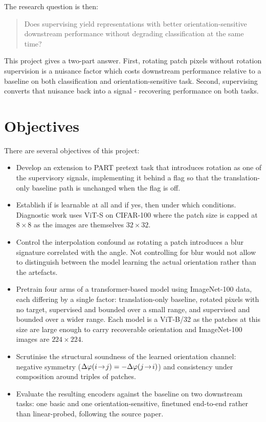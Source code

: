 \documentclass[final_report.tex]{subfiles}
\begin{document}
The research question is then: 
\begin{quote}Does supervising \dphi{} yield representations with better orientation-sensitive downstream performance without degrading classification at the same time?
\end{quote}

This project gives a two-part answer. First, rotating patch pixels without rotation supervision is a nuisance factor which costs downstream performance relative to a baseline on both classification and orientation-sensitive task. Second, supervising \dphi{} converts that nuisance back into a signal - recovering performance on both tasks.

\section{Objectives}\label{sec:objectives}
There are several objectives of this project:
\begin{itemize}
\item Develop an extension to PART pretext task that introduces rotation as one of the supervisory signals, implementing it behind a flag so that the translation-only baseline path is unchanged when the flag is off.
\item Establish if \dphi{} is learnable at all and if yes, then under which conditions. Diagnostic work uses ViT-S on CIFAR-100 where the patch size is capped at $8\times 8$ as the images are themselves $32\times 32$.
\item Control the interpolation confound as rotating a patch introduces a blur signature correlated with the angle. Not controlling for blur would not allow to distinguish between the model learning the actual orientation rather than the artefacts.
\item Pretrain four arms of a transformer-based model using ImageNet-100 data, each differing  by a single factor: translation-only baseline, rotated pixels with no \dphi{} target, \dphi{} supervised and bounded over a small range, and \dphi{} supervised and bounded over a wider range. Each model is a ViT-B/32 as the patches at this size are large enough to carry recoverable orientation and ImageNet-100 images are $224\times 224$.
\item Scrutinise the structural soundness of the learned orientation channel: negative symmetry ($\Delta\varphi(i\!\to\!j) = -\Delta\varphi(j\!\to\!i)$) and consistency under composition around triples of patches.
\item Evaluate the resulting encoders against the baseline on two downstream tasks: one basic and one orientation-sensitive, finetuned end-to-end rather than linear-probed, following the source paper.
\end{itemize}
\end{document}
